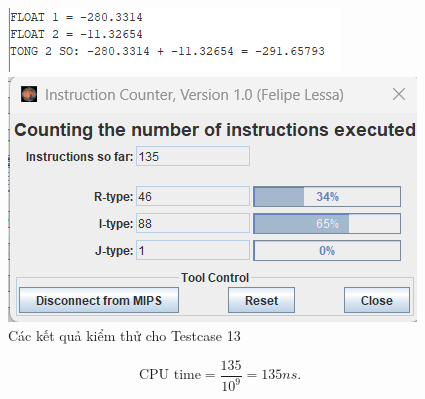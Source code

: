 \begin{figure}[!h]
    \centering
    \begin{minipage}[b]{0.48\textwidth}
        \centering
        \includegraphics[width=\textwidth]{image/TESTCASE/Testcase 13.png}
    \end{minipage}
    \hfill
    \begin{minipage}[b]{0.48\textwidth}
        \centering
        \includegraphics[width=\textwidth]{image/TESTCASE/Instruction Counter 13.png}
    \end{minipage}
    \vspace{0.5cm}
    \caption{Các kết quả kiểm thử cho Testcase 13}
\end{figure}
\[
\text{CPU time} = \frac{\text{135}}{10^9} = 135 ns.
\]

\newpage

